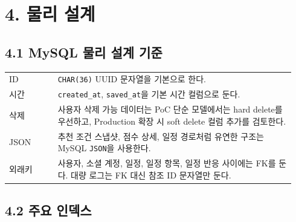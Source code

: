 \documentclass[12pt,a4paper]{article}
\newcommand{\DocNeedspace}[1]{\par\ifdim\dimexpr\pagegoal-\pagetotal\relax<#1\newpage\fi}
\begin{document}
\newpage

\DocNeedspace{10\baselineskip}
\section*{4. 물리 설계}


\DocNeedspace{8\baselineskip}
\subsection*{4.1 MySQL 물리 설계 기준}


\DocNeedspace{16\baselineskip}
\begin{small}
\begin{longtable}{@{}>{\centering\arraybackslash}m{0.160\linewidth}>{\RaggedRight\arraybackslash}m{0.780\linewidth}@{}}
\toprule
\multicolumn{1}{>{\centering\arraybackslash}m{0.160\linewidth}}{\textbf{기준}} & \multicolumn{1}{>{\centering\arraybackslash}m{0.780\linewidth}}{\textbf{결정}} \\
\midrule
\endhead
ID & \texttt{CHAR(36)} UUID 문자열을 기본으로 한다. \\
시간 & \texttt{created\_\allowbreak{}at}, \texttt{saved\_\allowbreak{}at}을 기본 시간 컬럼으로 둔다. \\
삭제 & 사용자 삭제 가능 데이터는 PoC 단순 모델에서는 hard delete를 우선하고, Production 확장 시 soft delete 컬럼 추가를 검토한다. \\
JSON & 추천 조건 스냅샷, 점수 상세, 일정 경로처럼 유연한 구조는 MySQL \texttt{JSON}을 사용한다. \\
외래키 & 사용자, 소셜 계정, 일정, 일정 항목, 일정 반응 사이에는 FK를 둔다. 대량 로그는 FK 대신 참조 ID 문자열만 둔다. \\
\bottomrule
\end{longtable}
\end{small}


\DocNeedspace{10\baselineskip}
\subsection*{4.2 주요 인덱스}
\end{document}

